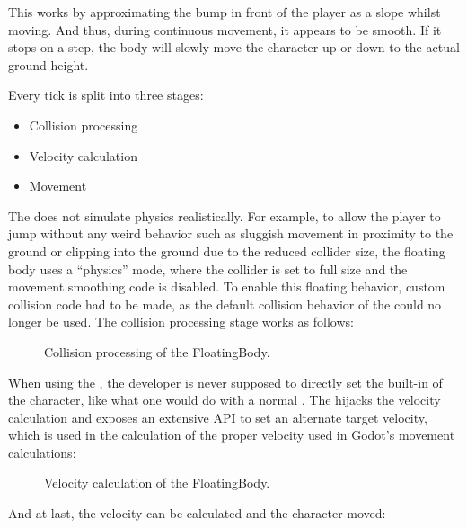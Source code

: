 \documentclass[../Main.tex]{subfiles}
\begin{document}
This works by approximating the bump in front of the player as a slope whilst moving. And thus, during continuous movement, it appears to be smooth. If it stops on a step, the body will slowly move the character up or down to the actual ground height.

Every tick is split into three stages:

\begin{itemize}
    \item Collision processing
    \item Velocity calculation
    \item Movement
\end{itemize}

The  does not simulate physics realistically. For example, to allow the player to jump without any weird behavior such as sluggish movement in proximity to the ground or clipping into the ground due to the reduced collider size, the floating body uses a \enquote{physics} mode, where the collider is set to full size and the movement smoothing code is disabled. To enable this floating behavior, custom collision code had to be made, as the default collision behavior of the  could no longer be used. The collision processing stage works as follows:

\begin{figure}[H]
    \centering
    
    \caption[Collision processing of the FloatingBody. Own figure.]{Collision processing of the FloatingBody.}
    \label{fig:floatingbody-collisions}
\end{figure}

When using the , the developer is never supposed to directly set the built-in  of the character, like what one would do with a normal . The  hijacks the velocity calculation and exposes an extensive API to set an alternate target velocity, which is used in the calculation of the proper velocity used in Godot's movement calculations:

\begin{figure}[H]
    \centering
    
    \caption[Velocity calculation of the FloatingBody. Own figure.]{Velocity calculation of the FloatingBody.}
    \label{fig:floatingbody-velocity}
\end{figure}

And at last, the velocity can be calculated and the character moved:
\end{document}
